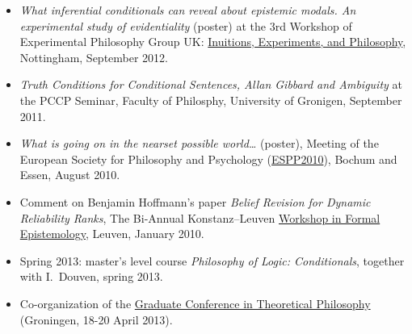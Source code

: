\documentclass[a4paper,12pt]{article}
\begin{document}
\begin{small}
\begin{itemize}
  \item \emph{What inferential conditionals can reveal about epistemic
      modals. An experimental study of evidentiality} (poster) at the 3rd
    Workshop of Experimental Philosophy Group UK: \href{https://www.nottingham.ac.uk/philosophy/research/conferences/workshop-intuitions-experimentsandphilosophy.aspx}{Inuitions,
    Experiments, and Philosophy}, Nottingham, September 2012.

  \item \emph{Truth Conditions for Conditional Sentences, Allan
      Gibbard and Ambiguity} at the PCCP Seminar, Faculty of
    Philosphy, University of Gronigen, September 2011.
    
  \item \emph{What is going on in the nearset possible world\ldots}
    (poster), Meeting of the European Society for Philosophy and
    Psychology (\href{http://www.ruhr-uni-bochum.de/philosophy/espp2010/index.html}{ESPP2010}), Bochum and Essen, August 2010.

  \item Comment on Benjamin Hoffmann's paper \emph{Belief Revision for
      Dynamic Reliability Ranks}, The Bi-Annual Konstanz--Leuven
    \href{http://formalphilosophy.org/node/580}{Workshop in Formal
      Epistemology}, Leuven, January 2010.
  \end{itemize}

  



  
  
\begin{itemize}
\item Spring 2013: master's level course \emph{Philosophy of Logic: Conditionals}, together with I.~Douven, spring 2013.
\end{itemize}

  
\begin{itemize}
\item Co-organization of the
  \href{http://www.philos.rug.nl/GCTP2013/}{Graduate Conference in
    Theoretical Philosophy} (Groningen, 18-20 April 2013).
\end{itemize}



\end{small}
\end{document}

